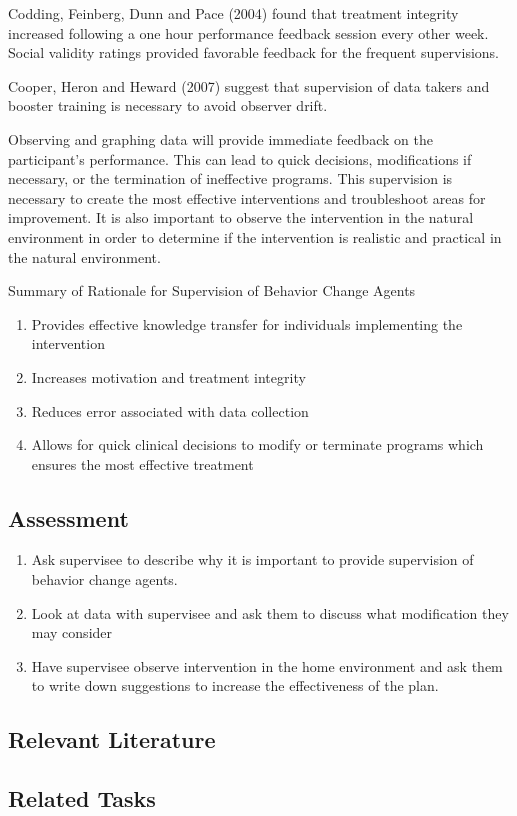 Codding, Feinberg, Dunn and Pace (2004) found that treatment integrity increased following a one hour performance feedback session every other week.  Social validity ratings provided favorable feedback for the frequent supervisions. 

Cooper, Heron and Heward (2007) suggest that supervision of data takers and booster training is necessary to avoid observer drift. 

Observing and graphing data will provide immediate feedback on the participant's performance.  This can lead to quick decisions, modifications if necessary, or the termination of ineffective programs.  This supervision is necessary to create the most effective interventions and troubleshoot areas for improvement. It is also important to observe the intervention in the natural environment in order to determine if the intervention is realistic and practical in the natural environment.

Summary of Rationale for Supervision of Behavior Change Agents
\begin{enumerate}
\item Provides effective knowledge transfer for individuals implementing the intervention
\item Increases motivation and treatment integrity
\item Reduces error associated with data collection
\item Allows for quick clinical decisions to modify or terminate programs which ensures the most effective treatment
\end{enumerate}
%
\subsection{Assessment}
\begin{enumerate}
\item Ask supervisee to describe why it is important to provide supervision of behavior change agents.
\item Look at data with supervisee and ask them to discuss what modification they may consider
\item Have supervisee observe intervention in the home environment and ask them to write down suggestions to increase the effectiveness of the plan.
%
\end{enumerate}
%
\subsection{Relevant Literature}
\begin{refsection}
\nocite{codding2005effects,
        cooper2007applied,
        miles2009effects,
        parsons1995training,
        sarokoff2004effects,
        smith1992transfer}
\printbibliography[heading=none]
\end{refsection} 
% 
\subsection{Related Tasks}
\fourhThree{}\\
\fourhFour{}\\
\fourkTwo{}\\
\fourkThree{}\\
\fourkFour{}\\
